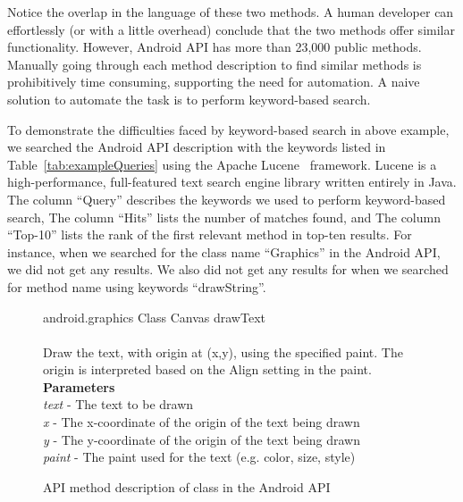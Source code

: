 Notice the overlap in the language of these two methods.
A human developer can effortlessly (or with a little overhead) conclude that
the two methods offer similar functionality.
However, Android API has more than 23,000 public methods.
Manually going through each method description to find similar methods
is prohibitively time consuming, supporting the need for automation.
A naive solution to automate the task is to perform keyword-based search. 
 
To demonstrate the difficulties faced by keyword-based search in above example,
we searched the Android API description with the keywords listed in Table~\ref{tab:exampleQueries} using the Apache Lucene~\cite{lucene} framework.
Lucene is a high-performance, full-featured text search engine library written entirely in Java.
The column ``Query'' describes the keywords we used to perform keyword-based search,
The column ``Hits'' lists the number of matches found, and
The column ``Top-10'' lists the rank of the first relevant method in top-ten results.
For instance, when we searched for the class name ``Graphics'' in the Android API,
we did not get any results.
We also did not get any results for when we searched for method name using keywords ``drawString''. 

\begin{figure}
	\begin{framed}
		\begin{small}
			{\small android.graphics} {\normalsize Class Canvas} {\large drawText}\\
			\\
			Draw the text, with origin at (x,y), using the specified paint. The origin is interpreted based on the Align setting in the paint.\\
			\textbf{Parameters}\\
			\textit{text} - The text to be drawn\\
			\textit{x} - The x-coordinate of the origin of the text being drawn\\
			\textit{y} - The y-coordinate of the origin of the text being drawn\\
			\textit{paint} - The paint used for the text (e.g. color, size, style)
		\end{small}
	\end{framed}
	\caption{ API method description of  class in the Android API}
	\label{fig:drawTextJavadoc}
\end{figure}

